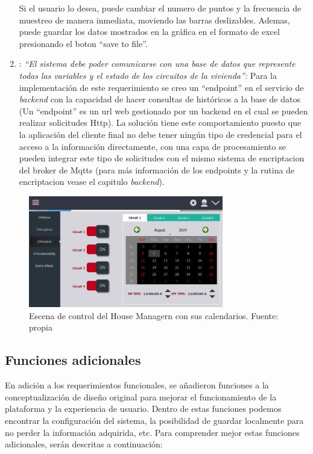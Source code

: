 \begin{enumerate}
	Si el usuario lo desea, puede cambiar el numero de puntos y la frecuencia de muestreo de manera inmediata, moviendo las barras deslizables. Ademas, puede guardar los datos mostrados en la gráfica en el formato de excel presionando el boton ``save to file''.
	\item: \textsl{``El sistema debe poder comunicarse con una base de datos que represente todas las variables y el estado de los circuitos de la vivienda'':} Para la implementación de este requerimiento se creo un ``endpoint'' en el servicio de \textit{backend} con la capacidad de hacer consultas de históricos a la base de datos (Un ``endpoint'' es un url web gestionado por un backend en el cual se pueden realizar solicitudes Http). La solución tiene este comportamiento puesto que la aplicación del cliente final no debe tener ningún tipo de credencial para el acceso a la información directamente, con una capa de procesamiento se pueden integrar este tipo de solicitudes con el mismo sistema de encriptacion del broker de Mqtts (para más información de los endpoints y la rutina de encriptacion vease el capitulo \textit{backend}).
\end{enumerate}


\begin{figure}[htbp]
	\centerline{\includegraphics[width=8.5cm]{figuras/housemanager_control.png}}
	\caption{Escena de control del House Managern con sus calendarios. Fuente: propia}
	\label{fig_8}
\end{figure}

\subsection{Funciones adicionales}

En adición a los requerimientos funcionales, se añadieron funciones a la conceptualización de diseño original para mejorar el funcionamiento de la plataforma y la experiencia de usuario. Dentro de estas funciones podemos encontrar la configuración del sistema, la posibilidad de guardar localmente para no perder la información adquirida, etc. Para comprender mejor estas funciones adicionales, serán descritas a continuación:

